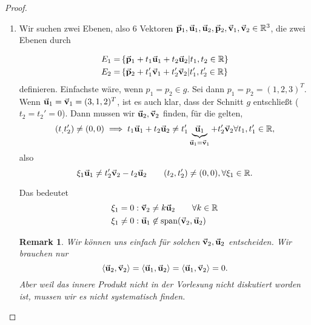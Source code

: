 \documentclass[prb,12pt]{revtex4-2}
\newtheorem{Remark}[Theorem]{Remark}
\theoremstyle{definition}
\theoremstyle{definition}
\newenvironment{parts}{\begin{enumerate}[label=(\alph*)]}{\end{enumerate}}
\newcommand{\R}{\mathbb{R}}
\begin{document}
\begin{proof}
	\begin{parts}
		\item  Wir suchen zwei Ebenen, also 6 Vektoren $\va p_1, \va u_1, \va u_2, \va p_2, \va v_1, \va v_2\in \R^3$, die zwei Ebenen durch
		
		\begin{align*}
			E_1=&\left\{ \va p_1+t_1\va u_1+t_2\va u_2|t_1,t_2\in \R \right\}\\
			E_2=&\left\{ \va p_2+t_1'\va v_1+t_2'\va v_2|t_1',t_2'\in \R \right\} 
		\end{align*}
		definieren. Einfachste wäre, wenn $p_1=p_2\in g$. Sei dann $p_1=p_2=(1,2,3)^T$. Wenn $\va u_1=\va v_1=(3,1,2)^T$, ist es auch klar, dass der Schnitt  $g$ entschließt ($t_2=t_2'=0$). Dann mussen wir $\va u_2, \va v_2$ finden, f\"{u}r die gelten, 
		\[(t_,t_2')\neq (0,0)\implies t_1\va u_1+t_2\va u_2\neq t_1' \underbrace{\va u_1}_{\va u_1=\va v_1}+t_2'\va v_2\forall t_1,t_1'\in \R,\]
		also
		\[
		\xi_1 \va u_1\neq t_2'\va v_2-t_2 \va u_2 \qquad (t_2,t_2')\neq (0,0), \forall \xi_1\in \R
		.\] 

		Das bedeutet
		\begin{align*}
			\xi_1=0&: \va v_2\neq k\va u_2 \qquad \forall k\in \R \\
			\xi_1\neq 0&: \va u_1\not\in \text{span}(\va v_2,\va u_2)
		\end{align*}
	
		\begin{Remark}
			Wir k\"{o}nnen uns einfach f\"{u}r solchen $\va v_2, \va u_2$ entscheiden. Wir brauchen nur
			\[
\left<\va u_2, \va v_2 \right> = \left<\va u_1, \va u_2 \right>	=\left<\va u_1, \va v_2 \right> =0		
			.\] 
			Aber weil das innere Produkt nicht in der Vorlesung nicht diskutiert worden ist, mussen wir es nicht systematisch finden.
		\end{Remark}


\end{parts}
\end{proof}
\end{document}

